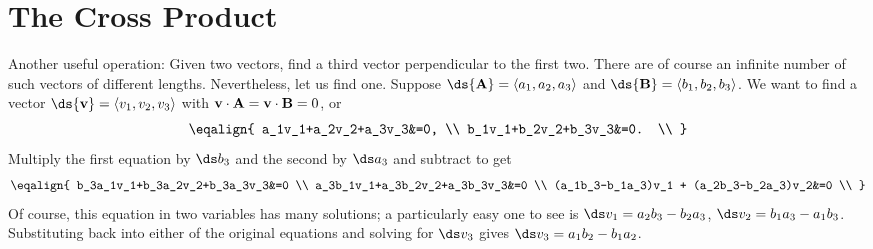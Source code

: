 \section{The Cross Product}{}{}
\nobreak
Another useful operation: Given two vectors, find a third vector
perpendicular to the first two. There are of course an infinite number
of such vectors of different lengths. Nevertheless, let us find one.
Suppose $\ds {\bf A}=\langle
a_1,a_2,a_3\rangle$ and $\ds {\bf B}=\langle b_1,b_2,b_3\rangle$. We want
to find a vector $\ds {\bf v} = \langle v_1,v_2,v_3\rangle$ with
${\bf v}\cdot{\bf A}={\bf v}\cdot{\bf B}=0$, or
$$\eqalign{
  a_1v_1+a_2v_2+a_3v_3&=0, \\
  b_1v_1+b_2v_2+b_3v_3&=0. \\
}$$
Multiply the first equation by $\ds b_3$ and the second by $\ds a_3$ and
subtract to get
$$\eqalign{
  b_3a_1v_1+b_3a_2v_2+b_3a_3v_3&=0 \\
  a_3b_1v_1+a_3b_2v_2+a_3b_3v_3&=0 \\
  (a_1b_3-b_1a_3)v_1 + (a_2b_3-b_2a_3)v_2&=0 \\
}$$
Of course, this equation in two variables has many solutions; a
particularly easy one to see is $\ds v_1=a_2b_3-b_2a_3$,
$\ds v_2=b_1a_3-a_1b_3$. Substituting back into either of the original
equations and solving for $\ds v_3$ gives $\ds v_3=a_1b_2-b_1a_2$.

